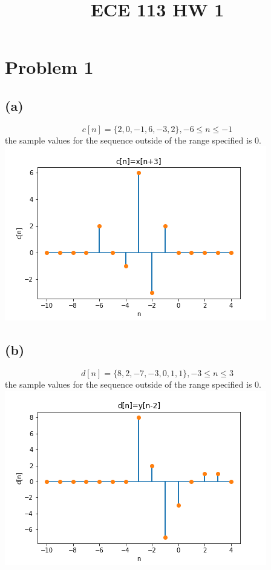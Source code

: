 
\title{ECE 113 HW 1}

\maketitle
\section*{Problem 1}
\subsection*{(a)}
$$\boxed{c[n]=\{2, 0, -1, 6, -3, 2\}, -6\leq n \leq-1}$$ 
the sample values for the sequence outside of the range specified
is 0.\\
\includegraphics[scale=0.5]{c.png}
\subsection*{(b)}
$$\boxed{d[n]=\{8, 2, -7, -3, 0, 1, 1\}, -3\leq n \leq3}$$ 
the sample values for the sequence outside of the range specified
is 0.\\
\includegraphics[scale=0.5]{d.png}
